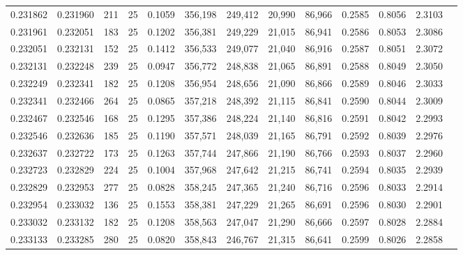 \begin{tabular}{rrrrrrrrrrrrr}
0.231862 & 0.231960 &   211 &  25 &                                     0.1059 & 356,198 & 249,412 &  20,990 &  86,966 & 0.2585 & 0.8056 & 2.3103 \\
0.231961 & 0.232051 &   183 &  25 &                                     0.1202 & 356,381 & 249,229 &  21,015 &  86,941 & 0.2586 & 0.8053 & 2.3086 \\
0.232051 & 0.232131 &   152 &  25 &                                     0.1412 & 356,533 & 249,077 &  21,040 &  86,916 & 0.2587 & 0.8051 & 2.3072 \\
0.232131 & 0.232248 &   239 &  25 &                                     0.0947 & 356,772 & 248,838 &  21,065 &  86,891 & 0.2588 & 0.8049 & 2.3050 \\
0.232249 & 0.232341 &   182 &  25 &                                     0.1208 & 356,954 & 248,656 &  21,090 &  86,866 & 0.2589 & 0.8046 & 2.3033 \\
0.232341 & 0.232466 &   264 &  25 &                                     0.0865 & 357,218 & 248,392 &  21,115 &  86,841 & 0.2590 & 0.8044 & 2.3009 \\
0.232467 & 0.232546 &   168 &  25 &                                     0.1295 & 357,386 & 248,224 &  21,140 &  86,816 & 0.2591 & 0.8042 & 2.2993 \\
0.232546 & 0.232636 &   185 &  25 &                                     0.1190 & 357,571 & 248,039 &  21,165 &  86,791 & 0.2592 & 0.8039 & 2.2976 \\
0.232637 & 0.232722 &   173 &  25 &                                     0.1263 & 357,744 & 247,866 &  21,190 &  86,766 & 0.2593 & 0.8037 & 2.2960 \\
0.232723 & 0.232829 &   224 &  25 &                                     0.1004 & 357,968 & 247,642 &  21,215 &  86,741 & 0.2594 & 0.8035 & 2.2939 \\
0.232829 & 0.232953 &   277 &  25 &                                     0.0828 & 358,245 & 247,365 &  21,240 &  86,716 & 0.2596 & 0.8033 & 2.2914 \\
0.232954 & 0.233032 &   136 &  25 &                                     0.1553 & 358,381 & 247,229 &  21,265 &  86,691 & 0.2596 & 0.8030 & 2.2901 \\
0.233032 & 0.233132 &   182 &  25 &                                     0.1208 & 358,563 & 247,047 &  21,290 &  86,666 & 0.2597 & 0.8028 & 2.2884 \\
0.233133 & 0.233285 &   280 &  25 &                                     0.0820 & 358,843 & 246,767 &  21,315 &  86,641 & 0.2599 & 0.8026 & 2.2858 \\

\end{tabular}
